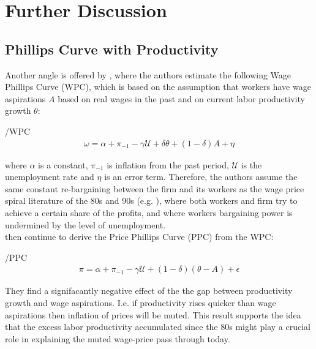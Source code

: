 \documentclass[ProjectDLO]{subfiles}
\begin{document}
\begin{minipage}{0.9\textwidth}
    \introduction
\end{minipage}

\label{Fig:WageGap}

\hypertarget{The-Model}{}

\section{Further Discussion}

\subsection{Phillips Curve with Productivity}\label{subsec:Setup}
Another angle is offered by \cite{BallMoffitt}, where the authors estimate the following Wage Phillips Curve (WPC), which is based on the assumption that workers have wage aspirations $A$ based on real wages in the past and on current labor productivity growth $\theta$:
\begin{verbatimwrite}{\EqDir/WPC}
 \begin{align}%
   \omega = \alpha + \pi_{-1} - \gamma \mathcal{U} + \delta \theta + (1- \delta) A + \eta
  \end{align}
\end{verbatimwrite}


where $\alpha$ is a constant, $\pi_{-1}$ is inflation from the past period, $\mathcal{U}$ is the unemployment rate and $\eta$ is an error term. Therefore, the authors assume the same constant re-bargaining between the firm and its workers as the wage price spiral literature of the 80s and 90s (e.g. \cite{Blanchard1986}), where both workers and firm try to achieve a certain share of the profits, and where workers bargaining power is undermined by the level of unemployment.\\

\cite{BallMoffitt} then continue to derive the Price Phillips Curve (PPC) from the WPC:

\begin{verbatimwrite}{\EqDir/PPC}
 \begin{align}%
   \pi = \alpha + \pi_{-1} - \gamma \mathcal{U} + (1-\delta)(\theta-A) + \epsilon
  \end{align}
\end{verbatimwrite}


They find a signifacantly negative effect of the the gap between productivity growth and wage aspirations. I.e. if productivity rises quicker than wage aspirations then inflation of prices will be muted. This result supports the idea that the excess labor productivity accumulated since the 80s might play a crucial role in explaining the muted wage-price pass through today.\\
\end{document}
